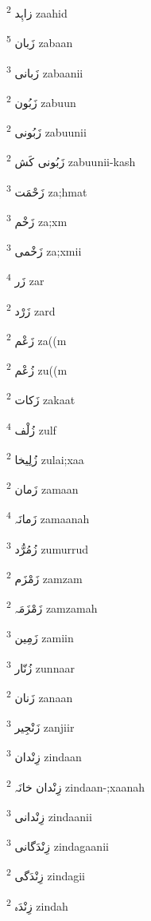 \documentclass[12pt]{article}
\begin{document}
\begin{multicols}{5}
{\ur زاہِد}   \textsuperscript{2} zaahid

{\ur زَبان}   \textsuperscript{5} zabaan

{\ur زَبانی}   \textsuperscript{3} zabaanii

{\ur زَبُون}   \textsuperscript{2} zabuun

{\ur زَبُونی}   \textsuperscript{2} zabuunii

{\ur زَبُونی کَش}   \textsuperscript{2} zabuunii-kash

{\ur زَحْمَت}   \textsuperscript{3} za;hmat

{\ur زَخْم}   \textsuperscript{3} za;xm

{\ur زَخْمی}   \textsuperscript{3} za;xmii

{\ur زَر}   \textsuperscript{4} zar

{\ur زَرْد}   \textsuperscript{2} zard

{\ur زَعْم}   \textsuperscript{2} za((m

{\ur زُعْم}   \textsuperscript{2} zu((m

{\ur زَکات}   \textsuperscript{2} zakaat

{\ur زُلْف}   \textsuperscript{4} zulf

{\ur زُلِیخا}   \textsuperscript{2} zulai;xaa

{\ur زَمان}   \textsuperscript{2} zamaan

{\ur زَمانَہ}   \textsuperscript{4} zamaanah

{\ur زُمُرُّد}   \textsuperscript{3} zumurrud

{\ur زَمْزَم}   \textsuperscript{2} zamzam

{\ur زَمْزَمَہ}   \textsuperscript{2} zamzamah

{\ur زَمِین}   \textsuperscript{3} zamiin

{\ur زُنّار}   \textsuperscript{3} zunnaar

{\ur زَنان}   \textsuperscript{2} zanaan

{\ur زَنْجِیر}   \textsuperscript{3} zanjiir

{\ur زِنْدان}   \textsuperscript{3} zindaan

{\ur زِنْدان خانَہ}   \textsuperscript{2} zindaan-;xaanah

{\ur زِنْدانی}   \textsuperscript{3} zindaanii

{\ur زِنْدَگانی}   \textsuperscript{3} zindagaanii

{\ur زِنْدَگی}   \textsuperscript{2} zindagii

{\ur زِنْدَہ}   \textsuperscript{2} zindah


\end{multicols}
\end{document}
